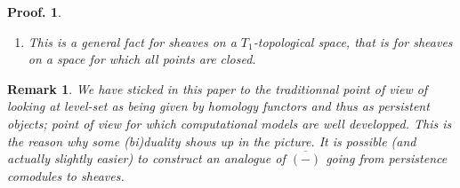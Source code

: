 \documentclass[a4paper, english, 11pt]{article}
\newcommand{\kk}[0]{\textbf{k}}
\newcommand{\0}{\vec{0}}
\newcommand{\Hom}[0]{\text{Hom}}
\newtheorem*{pf}{Proof.} }
\newtheorem{remark}[prop]{Remark}
\begin{document}
\begin{pf}
\begin{enumerate}
     
     Now if $\varprojlim\limits_{]-x;y[\ni \alpha}M((x,y))$ is finite dimensional then the above product in the right hand side of~\eqref{eq:porjlimM} is a finite product and thus a direct sum: 
     $\prod_{\substack{I\in \mathbb{B}(M\circ G)\\ 0 \in \text{closure}(I)}} \kk \; \simeq \; \bigoplus_{\substack{I\in \mathbb{B}(M\circ G)\\ 0 \in \text{closure}(I)}}.$ Therefore we have 
     \begin{align*}
        \varprojlim_{]-x;y[\ni \alpha}M((x,y))%
        & \simeq \bigoplus_{\substack{I\in \mathbb{B}(M\circ G)\\ 0 \in \text{closure}(I)}} \kk  \\
        &\simeq \varprojlim_{]-x;y[\ni \alpha} \Hom \left ( M((x,y)), \kk \right ) \; \text{ (by~\eqref{eq:DefMoG} and finite dimensionality)}\\ 
        &\simeq \tilde{M}_\alpha \; \text{ (by~\eqref{eq:defMtilde})}\\
        &\simeq \overline{M}_\alpha.
    \end{align*}
    \item This is a general fact for sheaves on a $T_1$-topological space, that is for sheaves on a space for which all   points are closed.
\end{enumerate}
\end{pf}
\begin{remark} We have sticked in this paper to the traditionnal point of view of looking at level-set as being given by homology functors and thus as persistent objects; point of view for which computational models are well developped. This is the reason why some (bi)duality shows up in the picture. It is possible (and actually slightly easier) to construct an analogue of $\overline{(-)}$ going from persistence comodules to sheaves.
\end{remark}
\end{document}
